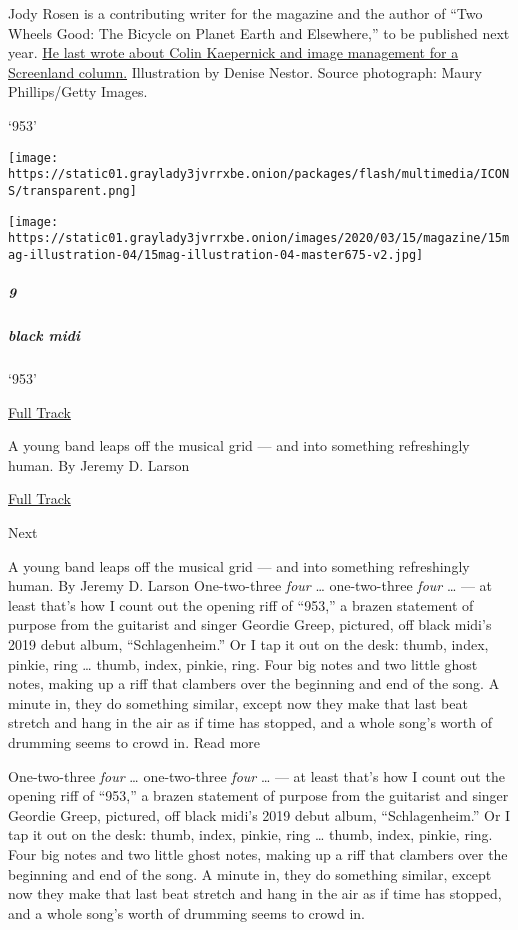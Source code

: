 Jody Rosen is a contributing writer for the magazine and the author of
``Two Wheels Good: The Bicycle on Planet Earth and Elsewhere,'' to be
published next year.
\href{https://www.nytimes3xbfgragh.onion/2019/12/12/magazine/colin-kaepernick-nfl-video.html}{He
last wrote about Colin Kaepernick and image management for a Screenland
column.} Illustration by Denise Nestor. Source photograph: Maury
Phillips/Getty Images.

`953'

\texttt{[image: https://static01.graylady3jvrrxbe.onion/packages/flash/multimedia/ICONS/transparent.png]}

\texttt{[image: https://static01.graylady3jvrrxbe.onion/images/2020/03/15/magazine/15mag-illustration-04/15mag-illustration-04-master675-v2.jpg]}

\hypertarget{9}{%
\subparagraph{9}\label{9}}

\hypertarget{black-midi}{%
\subparagraph{black midi}\label{black-midi}}

`953'

\href{https://open.spotify.com/track/1KFB35I79oxWR54uAewV2x?si=WnKVU5gJQqOPQpgJQL7xhA}{
Full Track}

A young band leaps off the musical grid --- and into something
refreshingly human. By Jeremy D. Larson

\href{https://open.spotify.com/track/1KFB35I79oxWR54uAewV2x?si=WnKVU5gJQqOPQpgJQL7xhA}{Full
Track }

Next

A young band leaps off the musical grid --- and into something
refreshingly human. By Jeremy D. Larson One-two-three \emph{four}
\ldots{} one-two-three \emph{four} \ldots{} --- at least that's how I
count out the opening riff of ``953,'' a brazen statement of purpose
from the guitarist and singer Geordie Greep, pictured, off black midi's
2019 debut album, ``Schlagenheim.'' Or I tap it out on the desk: thumb,
index, pinkie, ring \ldots{} thumb, index, pinkie, ring. Four big notes
and two little ghost notes, making up a riff that clambers over the
beginning and end of the song. A minute in, they do something similar,
except now they make that last beat stretch and hang in the air as if
time has stopped, and a whole song's worth of drumming seems to crowd
in. Read more

One-two-three \emph{four} \ldots{} one-two-three \emph{four} \ldots{}
--- at least that's how I count out the opening riff of ``953,'' a
brazen statement of purpose from the guitarist and singer Geordie Greep,
pictured, off black midi's 2019 debut album, ``Schlagenheim.'' Or I tap
it out on the desk: thumb, index, pinkie, ring \ldots{} thumb, index,
pinkie, ring. Four big notes and two little ghost notes, making up a
riff that clambers over the beginning and end of the song. A minute in,
they do something similar, except now they make that last beat stretch
and hang in the air as if time has stopped, and a whole song's worth of
drumming seems to crowd in.

